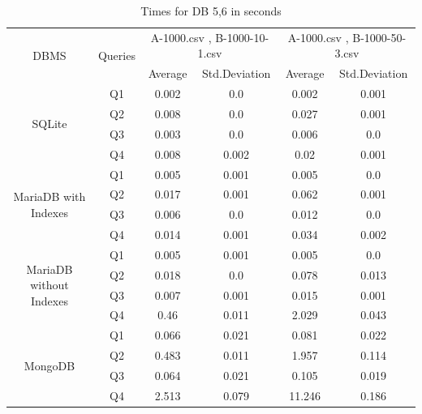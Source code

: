 \documentclass[12pt]{article}
\begin{document}
\begin{table}[H]
    \centering
\begin{tabular}{|c|c|c|c|c|c|}
    \hline
    \multirow{2}{*}{DBMS} & \multirow{2}{*}{Queries} & \multicolumn{2}{c|}{A-1000.csv , B-1000-10-1.csv} & \multicolumn{2}{c|}{A-1000.csv , B-1000-50-3.csv}\\
    \cline{3-6}
     & & Average & Std.Deviation & Average & Std.Deviation\\
    \hline
     \multirow{4}{*}{SQLite}& Q1 & 0.002 & 0.0 & 0.002 & 0.001 \\
\cline{2-6}
& Q2 & 0.008 & 0.0 & 0.027 & 0.001 \\
\cline{2-6}
& Q3 & 0.003 & 0.0 & 0.006 & 0.0 \\
\cline{2-6}
& Q4 & 0.008 & 0.002 & 0.02 & 0.001 \\
     \cline{2-6}
     \hline
     \multirow{4}{*}{MariaDB with Indexes} & Q1 & 0.005 & 0.001 & 0.005 & 0.0 \\
\cline{2-6}
& Q2 & 0.017 & 0.001 & 0.062 & 0.001 \\
\cline{2-6}
& Q3 & 0.006 & 0.0 & 0.012 & 0.0 \\
\cline{2-6}
& Q4 & 0.014 & 0.001 & 0.034 & 0.002 \\

     \cline{2-6}
    \hline
    \multirow{4}{*}{MariaDB without Indexes} 
& Q1 & 0.005 & 0.001 & 0.005 & 0.0 \\
\cline{2-6}
& Q2 & 0.018 & 0.0 & 0.078 & 0.013 \\
\cline{2-6}
& Q3 & 0.007 & 0.001 & 0.015 & 0.001 \\
\cline{2-6}
& Q4 & 0.46 & 0.011 & 2.029 & 0.043 \\
     \cline{2-6}
    \hline
    \multirow{4}{*}{MongoDB} 
& Q1 & 0.066 & 0.021 & 0.081 & 0.022 \\
\cline{2-6}
& Q2 & 0.483 & 0.011 & 1.957 & 0.114 \\
\cline{2-6}
& Q3 & 0.064 & 0.021 & 0.105 & 0.019 \\
\cline{2-6}
& Q4 & 2.513 & 0.079 & 11.246 & 0.186 \\

     \cline{2-6}
    \hline
\end{tabular}

    \caption{Times for DB 5,6 in seconds}
    \label{tab:my_label}
\end{table}
\end{document}

